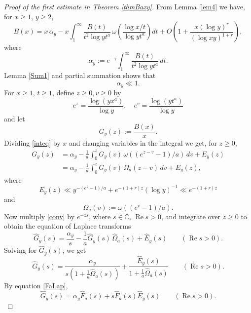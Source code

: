 \documentclass[11pt]{amsart}
\DeclareMathOperator{\re}{Re}
\begin{document}
\begin{proof}[Proof of the first estimate in Theorem \ref{thmBaxy}]
From Lemma \ref{lem4} we have, for $x\ge 1$, $y\ge 2$, 
\begin{equation}\label{inteq}
B(x)= x \, \alpha_y - x \int_{1}^{\infty} \frac{B(t)}{t^2 \log y t^a} 
\, \omega\left(\frac{\log x/t}{\log y t^a}\right) d t
 +  O\left(1+\frac{x (\log y)^r}{(\log xy)^{1+r}}\right),
\end{equation}
where
$$ \alpha_y:=e^{-\gamma} \int_{1}^{\infty} \frac{B(t)}{t^2 \log y t^a} \, d t . $$
Lemma \ref{Sum1} and partial summation shows that 
\begin{equation}\label{alphaestimate}
\alpha_y \ll 1.
\end{equation}
For $x\ge 1$, $t\ge 1$, define $z\ge 0, v\ge 0$ by  
$$e^z=\frac{\log (y x^a)}{\log y}, \quad e^v =\frac{\log(y t^a)}{\log y} $$
and let
$$ G_y(z) := \frac{B(x)}{x} .$$
Dividing \eqref{inteq} by $x$ and changing variables in the integral we get, for $z\ge 0$,
\begin{equation}\label{conv}
\begin{split}
G_y(z) & =  \alpha_y - \frac{1}{a} \int_{0}^{z} G_y(v) \, \omega\left((e^{z-v} -1)/a\right) \, d v +E_y(z) \\
       & = \alpha_y -\frac{1}{a}  \int_{0}^{z} G_y(v) \, \Omega_a(z-v)  \, d v +E_y(z), 
\end{split} 
\end{equation}
where 
\begin{equation}\label{Error}
E_y(z) \ll  y^{-(e^z-1)/a}+e^{-(1+r)z} (\log y)^{-1} \ll e^{-(1+r)z}
\end{equation}
and
$$ \Omega_a(v):= \omega\left((e^{v} -1)/a\right) . $$
Now multiply \eqref{conv} by $e^{-zs}$, where $s\in \mathbb{C}$, $\re s > 0$, and integrate over $z\ge 0$ to obtain the equation of Laplace transforms
$$
 \widehat{G}_y(s) = \frac{\alpha_y}{s} -\frac{1}{a} \widehat{G}_y(s) \, \widehat{\Omega}_a(s) + \widehat{E}_y(s) \qquad (\re s >0).
$$
Solving for $\widehat{G}_y(s)$, we get
\begin{equation*}\label{LaplaceEq}
\widehat{G}_y(s) = \frac{\alpha_y}{s (1+\frac{1}{a}\widehat{\Omega}_a(s))} + \frac{\widehat{E}_y(s)}{1+\frac{1}{a}\widehat{\Omega}_a(s)}
\qquad (\re s >0).
\end{equation*}
By equation \eqref{FaLap},
\begin{equation}\label{LaplaceEq2}
\widehat{G}_y(s) =  \alpha_y \widehat{F}_a(s) + s  \widehat{F}_a(s)\widehat{E}_y(s)
\qquad (\re s >0).
\end{equation}


\end{proof}
\end{document}
